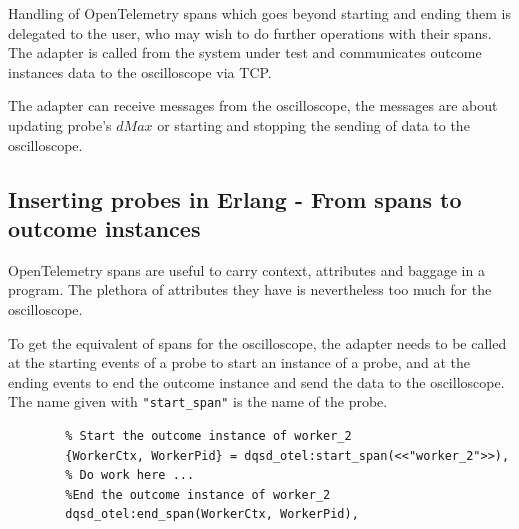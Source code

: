     Handling of OpenTelemetry spans which goes beyond starting and ending them is delegated to the user, who may wish to do further operations with their spans. 
    The adapter is called from the system under test and communicates outcome instances data to the oscilloscope via TCP. 
    
    The adapter can receive messages from the oscilloscope, the messages are about updating probe's $dMax$ or starting and stopping the sending of data to the oscilloscope.
    \subsection{Inserting probes in Erlang - From spans to outcome instances}
        OpenTelemetry spans are useful to carry context, attributes and baggage in a program. The plethora of attributes they have is nevertheless too much for the oscilloscope.

        To get the equivalent of spans for the oscilloscope, the adapter needs to be called at the starting events of a probe to start an instance of a probe, and at the ending events to end the outcome instance and send the data to the oscilloscope. The name given with \texttt{"start\_span"} is the name of the probe.

        \begin{verbatim}
        % Start the outcome instance of worker_2 
        {WorkerCtx, WorkerPid} = dqsd_otel:start_span(<<"worker_2">>),   
        % Do work here ...
        %End the outcome instance of worker_2
        dqsd_otel:end_span(WorkerCtx, WorkerPid),
        \end{verbatim}
